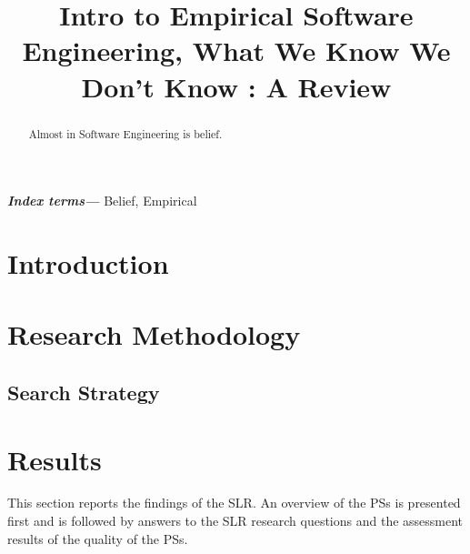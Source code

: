 \documentclass[conference, compsoc, twoside]{IEEEtran}
\begin{document}
\preto\tabular{\setcounter{magicrownumbers}{0}}
\newcommand\rownumber{\stepcounter{magicrownumbers}\arabic{magicrownumbers}}
\title{\Huge Intro to Empirical Software Engineering, What We Know We Don't Know : A Review}
\author{
}

\maketitle
\providecommand{\keywords}[1]{\textbf{\textit{Index terms---}} #1}
\begin{abstract}
Almost in Software Engineering is belief.
\end{abstract}

\keywords{Belief, Empirical}
\IEEEpeerreviewmaketitle

\section{Introduction}

\section{Research Methodology}

\subsection{Search Strategy}

\section{Results}
This section reports the findings of the SLR. An overview of the PSs is presented first and is followed by answers to the SLR research questions and the assessment results of the quality of the PSs. 
\end{document}
